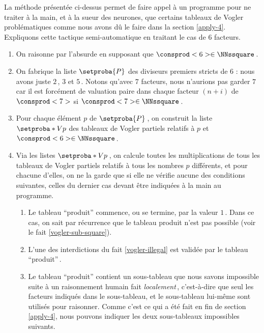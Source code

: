 La méthode présentée ci-dessus permet de faire appel à un programme pour ne traiter à la main, et à la sueur des neurones, que certains tableaux de Vogler problématiques comme nous avons dû le faire dans la section \ref{apply-4}.
Expliquons cette tactique semi-automatique en traitant le cas de $6$ facteurs.


\begin{enumerate}
	\item On raisonne par l'absurde en supposant que $\consprod<6> \in \NNssquare$\,.
	
 
	\item On fabrique la liste $\setproba{P}$ des diviseurs premiers stricts de $6$ : nous avons juste $2$\,, $3$ et $5$\,.
	Notons qu'avec $7$ facteurs, nous n'aurions pas garder $7$ car il est forcément de valuation paire dans chaque facteur $(n + i)$ de $\consprod<7>$ si $\consprod<7> \in \NNssquare$\,.
	
 
	\item Pour chaque élément $p$ de $\setproba{P}$\,, on construit la liste $\setproba*{V}{p}$ des tableaux de Vogler partiels relatifs à $p$ et $\consprod<6> \in \NNssquare$\,.
	
 
	\item Via les listes $\setproba*{V}{p}$\,, on calcule toutes les multiplications de tous les tableaux de Vogler partiels relatifs à tous les nombres $p$ différents, et pour chacune d'elles, on ne la garde que si elle ne vérifie aucune des conditions suivantes, celles du dernier cas devant être indiquées à la main au programme.
	\begin{enumerate}
		\item Le tableau \enquote{produit} commence, ou se termine, par la valeur $1$\,. Dans ce cas, on sait par récurrence que le tableau produit n'est pas possible (voir le fait \ref{vogler-sub-square}). 

		\item L'une des interdictions du fait \ref{vogler-illegal} est validée par le tableau \enquote{produit}\,.
		
		\item Le tableau \enquote{produit} contient un sous-tableau que nous savons impossible suite à un raisonnement humain fait \emph{localement}\,, c'est-à-dire que seul les facteurs indiqués dans le sous-tableau, et le sous-tableau lui-même sont utilisés pour raisonner.
		Comme c'est ce qui a été fait en fin de section \ref{apply-4}, nous pouvons indiquer les deux sous-tableaux impossibles suivants.
	\end{enumerate}
\end{enumerate}

